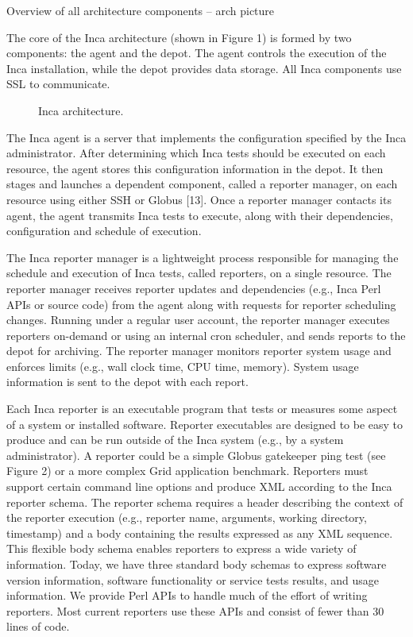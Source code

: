 \documentclass[times, 10pt,twocolumn]{article}
\begin{document}
Overview of all architecture components -- arch picture

The core of the Inca architecture (shown in Figure 1) is formed by two
components: the agent and the depot.  The agent controls the execution of the
Inca installation, while the depot provides data storage. All Inca components
use SSL to communicate.

\begin{figure}[Htb]
  \centering
  \mbox{}
  \caption{\label{arch_fig} Inca architecture.}
\end{figure}

The Inca agent is a server that implements the configuration specified by the
Inca administrator.  After determining which Inca tests should be executed on
each resource, the agent stores this configuration information in the depot.
It then stages and launches a dependent component, called a reporter manager,
on each resource using either SSH or Globus [13].  Once a reporter manager
contacts its agent, the agent transmits Inca tests to execute, along with
their dependencies, configuration and schedule of execution. 
  
The Inca reporter manager is a lightweight process responsible for managing
the schedule and execution of Inca tests, called reporters, on a single
resource. The reporter manager receives reporter updates and dependencies
(e.g., Inca Perl APIs or source code) from the agent along with requests for
reporter scheduling changes.  Running under a regular user account, the
reporter manager executes reporters on-demand or using an internal cron
scheduler, and sends reports to the depot for archiving. The reporter
manager monitors reporter system usage and enforces limits (e.g., wall clock
time, CPU time, memory).  System usage information is sent to the depot with
each report. 


Each Inca reporter is an executable program that tests or measures some
aspect of a system or installed software.   Reporter executables are
designed to be easy to produce and can be run outside of the Inca system
(e.g., by a system administrator).  A reporter could be a simple Globus
gatekeeper ping test (see Figure 2) or a more complex Grid application
benchmark.  Reporters must support certain command line options and produce
XML according to the Inca reporter schema.  The reporter schema requires a
header describing the context of the reporter execution (e.g., reporter
name, arguments, working directory, timestamp) and a body containing the
results expressed as any XML sequence. This flexible body schema enables
reporters to express a wide variety of information.  Today, we have three
standard body schemas to express software version information, software
functionality or service tests results, and usage information.  We provide
Perl APIs to handle much of the effort of writing reporters.  Most current
reporters use these APIs and consist of fewer than 30 lines of code.  
\end{document}
